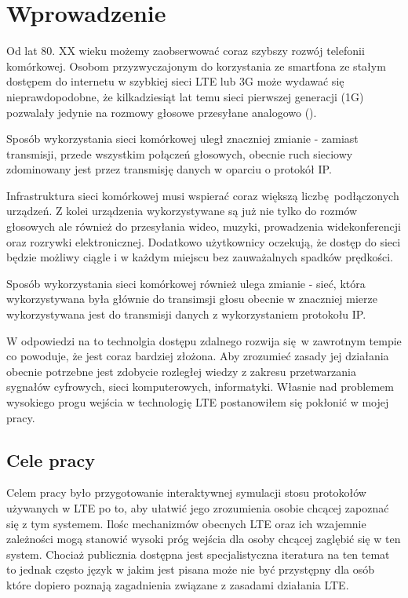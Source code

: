 \chapter{Wprowadzenie}
\label{cha:wprowadzenie}

Od lat 80. XX wieku możemy zaobserwować coraz szybszy rozwój telefonii komórkowej. Osobom przyzwyczajonym do korzystania ze smartfona ze stałym dostępem do internetu w szybkiej sieci LTE lub 3G może wydawać się nieprawdopodobne, że kilkadziesiąt lat temu sieci pierwszej generacji (1G) pozwalały jedynie na rozmowy głosowe przesyłane analogowo (\cite{TanWet11}).

Sposób wykorzystania sieci komórkowej uległ znaczniej zmianie - zamiast transmisji, przede wszystkim połączeń głosowych, obecnie ruch sieciowy zdominowany jest przez transmisję danych w oparciu o protokół IP.

Infrastruktura sieci komórkowej musi wspierać coraz większą liczbę podłączonych urządzeń. Z kolei urządzenia wykorzystywane są już nie tylko do rozmów głosowych ale również do przesyłania wideo, muzyki, prowadzenia widekonferencji oraz rozrywki elektronicznej. Dodatkowo użytkownicy oczekują, że dostęp do sieci będzie możliwy ciągle i w każdym miejscu bez zauważalnych spadków prędkości.

Sposób wykorzystania sieci komórkowej również ulega zmianie - sieć, która wykorzystywana była głównie do transimsji głosu obecnie w znaczniej mierze wykorzystywana jest do transmisji danych z wykorzystaniem protokołu IP.

W odpowiedzi na to technolgia dostępu zdalnego rozwija się w zawrotnym tempie co powoduje, że jest coraz bardziej złożona. Aby zrozumieć zasady jej działania obecnie potrzebne jest zdobycie rozległej wiedzy z zakresu przetwarzania sygnałów cyfrowych, sieci komputerowych, informatyki. Własnie nad problemem wysokiego progu wejścia w technologię LTE postanowiłem się pokłonić w mojej pracy.

\section{Cele pracy}
\label{sec:celePracy}

Celem pracy było przygotowanie interaktywnej symulacji stosu protokołów używanych w LTE po to, aby ułatwić jego zrozumienia osobie chcącej zapoznać się z tym systemem. Ilośc mechanizmów obecnych LTE oraz ich wzajemnie zależności mogą stanowić wysoki próg wejścia dla osoby chcącej zaglębić się w ten system. Chociaż publicznia dostępna jest specjalistyczna iteratura na ten temat to jednak często język w jakim jest pisana może nie być przystępny dla osób które dopiero poznają zagadnienia związane z zasadami działania LTE. 

